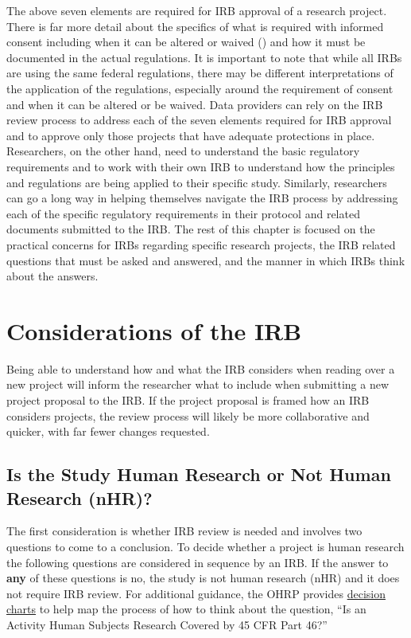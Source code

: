 The above seven elements are required for IRB approval of a research project. There is far more detail about the specifics of what is required with informed consent including when it can be altered or waived (\citet{codeoffederalregulations2017a}) and how it must be documented in the actual regulations. It is important to note that while all IRBs are using the same federal regulations, there may be different interpretations of the application of the regulations, especially around the requirement of consent and when it can be altered or be waived. Data providers can rely on the IRB review process to address each of the seven elements required for IRB approval and to approve only those projects that have adequate protections in place. Researchers, on the other hand, need to understand the basic regulatory requirements and to work with their own IRB to understand how the principles and regulations are being applied to their specific study. Similarly, researchers can go a long way in helping themselves navigate the IRB process by addressing each of the specific regulatory requirements in their protocol and related documents submitted to the IRB.
The rest of this chapter is focused on the practical concerns for IRBs regarding specific research projects, the IRB related questions that must be asked and answered, and the manner in which IRBs think about the answers.

\hypertarget{considerations-of-the-irb}{%
\section{Considerations of the IRB}\label{considerations-of-the-irb}}

Being able to understand how and what the IRB considers when reading over a new project will inform the researcher what to include when submitting a new project proposal to the IRB. If the project proposal is framed how an IRB considers projects, the review process will likely be more collaborative and quicker, with far fewer changes requested.

\hypertarget{is-the-study-human-research-or-not-human-research-nhr}{%
\subsection{Is the Study Human Research or Not Human Research (nHR)?}\label{is-the-study-human-research-or-not-human-research-nhr}}

The first consideration is whether IRB review is needed and involves two questions to come to a conclusion. To decide whether a project is human research the following questions are considered in sequence by an IRB. If the answer to \textbf{any} of these questions is no, the study is not human research (nHR) and it does not require IRB review. For additional guidance, the OHRP provides \href{https://www.hhs.gov/ohrp/regulations-and-policy/decision-charts/index.html}{decision charts} \citep{officeforhumanresearchprotections2020} to help map the process of how to think about the question, ``Is an Activity Human Subjects Research Covered by 45 CFR Part 46?''

